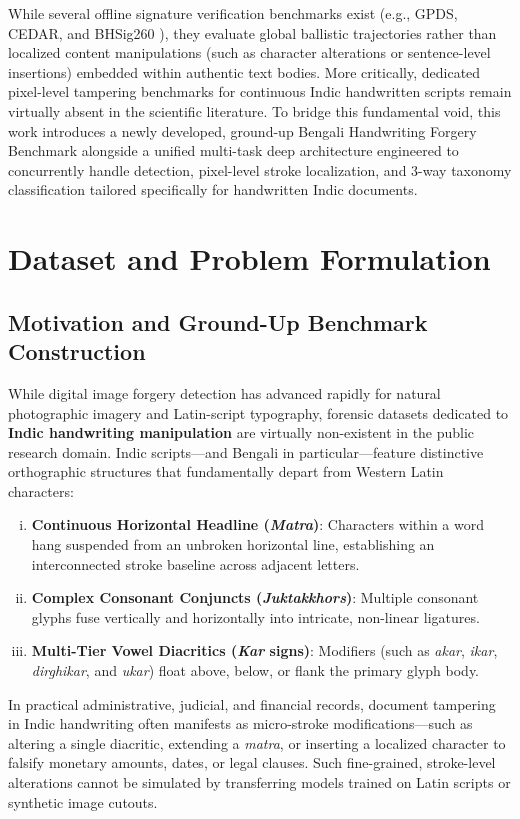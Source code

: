 \documentclass[pdflatex,sn-mathphys-num,iicol]{sn-jnl}
\begin{document}
While several offline signature verification benchmarks exist (e.g., GPDS, CEDAR, and BHSig260 \cite{bib13}), they evaluate global ballistic trajectories rather than localized content manipulations (such as character alterations or sentence-level insertions) embedded within authentic text bodies. More critically, dedicated pixel-level tampering benchmarks for continuous Indic handwritten scripts remain virtually absent in the scientific literature. To bridge this fundamental void, this work introduces a newly developed, ground-up Bengali Handwriting Forgery Benchmark alongside a unified multi-task deep architecture engineered to concurrently handle detection, pixel-level stroke localization, and 3-way taxonomy classification tailored specifically for handwritten Indic documents.

\section{Dataset and Problem Formulation}\label{sec3}

\subsection{Motivation and Ground-Up Benchmark Construction}\label{subsec3_1}
While digital image forgery detection has advanced rapidly for natural photographic imagery and Latin-script typography, forensic datasets dedicated to \textbf{Indic handwriting manipulation} are virtually non-existent in the public research domain. Indic scripts---and Bengali in particular---feature distinctive orthographic structures that fundamentally depart from Western Latin characters:
\begin{enumerate}[(i)]
    \item \textbf{Continuous Horizontal Headline (\textit{Matra})}: Characters within a word hang suspended from an unbroken horizontal line, establishing an interconnected stroke baseline across adjacent letters.
    \item \textbf{Complex Consonant Conjuncts (\textit{Juktakkhors})}: Multiple consonant glyphs fuse vertically and horizontally into intricate, non-linear ligatures.
    \item \textbf{Multi-Tier Vowel Diacritics (\textit{Kar} signs)}: Modifiers (such as \textit{akar}, \textit{ikar}, \textit{dirghikar}, and \textit{ukar}) float above, below, or flank the primary glyph body.
\end{enumerate}
In practical administrative, judicial, and financial records, document tampering in Indic handwriting often manifests as micro-stroke modifications---such as altering a single diacritic, extending a \textit{matra}, or inserting a localized character to falsify monetary amounts, dates, or legal clauses. Such fine-grained, stroke-level alterations cannot be simulated by transferring models trained on Latin scripts or synthetic image cutouts.
\end{document}
